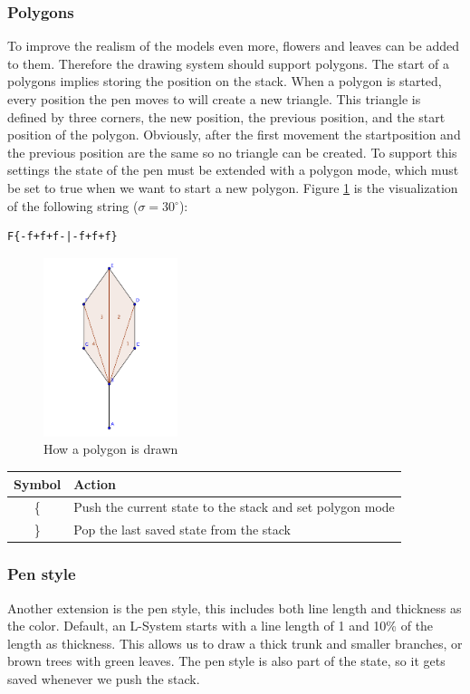 \documentclass[11pt,a4paper]{article}
\newcommand{\degree}{\ensuremath{^\circ}}
\begin{document}
\subsubsection{Polygons}
To improve the realism of the models even more, flowers and leaves can be added to them. Therefore the drawing system should support polygons. The start of a polygons implies storing the position on the stack. When a polygon is started, every position the pen moves to will create a new triangle. This triangle is defined by three corners, the new position, the previous position, and the start position of the polygon. Obviously, after the first movement the startposition and the previous position are the same so no triangle can be created. To support this settings the state of the pen must be extended with a polygon mode, which must be set to true when we want to start a new polygon.
Figure \ref{fig:polygon} is the visualization of the following string ($\sigma = 30\degree$):
\begin{verbatim}
F{-f+f+f-|-f+f+f}
\end{verbatim}

\begin{figure}[h!]
  \centering
  \includegraphics[width=0.35\textwidth]{polygons.pdf}
  \caption{How a polygon is drawn}
  \label{fig:polygon}
\end{figure}

\begin{center}
\begin{tabular}{c | l}
Symbol & Action \\ \hline
\{ & Push the current state to the stack and set polygon mode \\
\} & Pop the last saved state from the stack \\
\end{tabular}
\end{center}

\subsubsection{Pen style}
Another extension is the pen style, this includes both line length and thickness as the color. Default, an L-System starts with a line length of 1 and 10\% of the length as thickness. This allows us to draw a thick trunk and smaller branches, or brown trees with green leaves. The pen style is also part of the state, so it gets saved whenever we push the stack.
\end{document}
